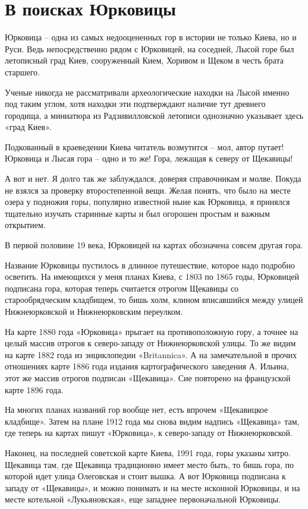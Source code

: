 \chapter{В поисках Юрковицы}

Юрковица – одна из самых недооцененных гор в истории не только Киева, но и Руси. Ведь непосредственно рядом с Юрковицей, на соседней, Лысой горе был летописный град Киев, сооруженный Кием, Хоривом и Щеком в честь  брата старшего.

Ученые никогда не рассматривали археологические находки на Лысой именно под таким углом, хотя находки эти подтверждают наличие тут древнего городища, а миниатюра из Радзивилловской летописи однозначно указывает здесь «град Киев».

Подкованный в краеведении Киева читатель возмутится – мол, автор путает! Юрковица и Лысая гора – одно и то же! Гора, лежащая к северу от Щекавицы!

А вот и нет. Я долго так же заблуждался, доверяя справочникам и молве. Покуда не взялся за проверку второстепенной вещи. Желая понять, что было на месте озера у подножия горы, популярно известной ныне как Юрковица, я принялся тщательно изучать старинные карты и был огорошен простым и важным открытием.

В первой половине 19 века, Юрковицей на картах обозначена совсем другая гора.

Название Юрковицы пустилось в длинное путешествие, которое надо подробно осветить. На имеющихся у меня планах Киева, с 1803 по 1865 годы, Юрковицей подписана гора, которая теперь считается отрогом Щекавицы со старообрядческим кладбищем, то бишь холм, клином вписавшийся между улицей Нижнеюрковской и Нижнеюрковским переулком.

На карте 1880 года «Юрковица» прыгает на противоположную гору, а точнее на целый массив отрогов к северо-западу от Нижнеюрковской улицы. То же видим на карте 1882 года из энциклопедии «Britannica». А на замечательной в прочих отношениях карте 1886 года издания картографического заведения А. Ильина, этот же массив отрогов подписан «Щекавица». Сие повторено на французской карте 1896 года.

На многих планах названий гор вообще нет, есть впрочем «Щекавицкое кладбище». Затем на плане 1912 года мы снова видим надпись «Щекавица» там, где теперь на картах пишут «Юрковица», к северо-западу от Нижнеюрковской.

Наконец, на последней советской карте Киева, 1991 года, горы указаны хитро. Щекавица там, где Щекавица традиционно имеет место быть, то бишь гора, по которой идет улица Олеговская и стоит вышка. А вот Юрковица подписана к западу от «Щекавицы», и можно понимать и на месте исконной Юрковицы, и на месте котельной «Лукьяновская», еще западнее первоначальной Юрковицы. 

